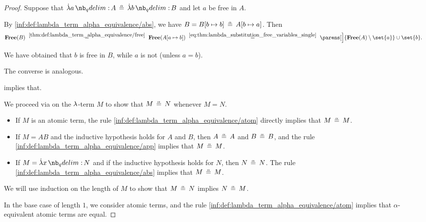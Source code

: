\begin{proof}

  \SufficiencySubProof* Suppose that \( \qabs a A \aequiv \qabs b B \) and let \( a \) be free in \( A \).

  By \ref{inf:def:lambda_term_alpha_equivalence/abs}, we have \( B = B[b \mapsto b] \aequiv A[b \mapsto a] \). Then
  \begin{equation*}
    \op*{Free}(B)
    \reloset {\ref{thm:def:lambda_term_alpha_equivalence/free}} =
    \op*{Free}(A[a \mapsto b])
    \reloset {\eqref{eq:thm:lambda_substitution_free_variables_single}} =
    \parens[\Big]{ \op*{Free}(A) \setminus \set{ a } } \cup \set{ b }.
  \end{equation*}

  We have obtained that \( b \) is free in \( B \), while \( a \) is not (unless \( a = b \)).

  \NecessitySubProof* The converse is analogous.

   implies that.


   We proceed via  on the \( {\mathrm \lambda} \)-term \( M \) to show that \( M \aequiv N \) whenever \( M = N \).
  \begin{itemize}
    \item If \( M \) is an atomic term, the rule \ref{inf:def:lambda_term_alpha_equivalence/atom} directly implies that \( M \aequiv M \).
    \item If \( M = AB \) and the inductive hypothesis holds for \( A \) and \( B \), then \( A \aequiv A \) and \( B \aequiv B \), and the rule \ref{inf:def:lambda_term_alpha_equivalence/app} implies that \( M \aequiv M \).
    \item If \( M = \qabs x N \) and if the inductive hypothesis holds for \( N \), then \( N \aequiv N \). The rule \ref{inf:def:lambda_term_alpha_equivalence/abs} implies that \( M \aequiv M \).
  \end{itemize}

   We will use induction on the length of \( M \) to show that \( M \aequiv N \) implies \( N \aequiv M \).

  In the base case of length \( 1 \), we consider atomic terms, and the rule \ref{inf:def:lambda_term_alpha_equivalence/atom} implies that \( \alpha \)-equivalent atomic terms are equal.


\end{proof}
